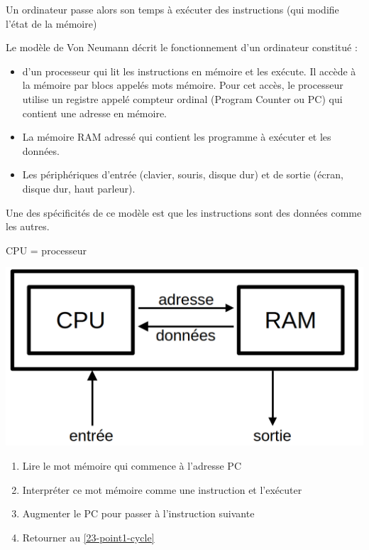 \begin{principe}
	Un ordinateur passe alors son temps à exécuter des instructions (qui modifie l'état de la mémoire)
\end{principe}

\begin{definition}
 	Le modèle de Von Neumann décrit le fonctionnement d'un ordinateur constitué : \begin{itemize}[label=$\bullet$] 
		\item d'un processeur qui lit les instructions en mémoire et les exécute. Il accède à la mémoire par blocs appelés mots mémoire. Pour cet accès, le processeur utilise un registre appelé compteur ordinal (Program Counter ou PC) qui contient une adresse en mémoire.
		\item La mémoire RAM adressé qui contient les programme à exécuter et les données. 
		\item Les périphériques d'entrée (clavier, souris, disque dur) et de sortie (écran, disque dur, haut parleur).
	 \end{itemize}
\end{definition}

\begin{rem}
	Une des spécificités de ce modèle est que les instructions sont des données comme les autres.
\end{rem}

\begin{personalise} CPU = processeur
	\begin{center}
		\includegraphics[width=0.5\linewidth]{lecon/23-archi-assembleur/modele_neumann.png}
	\end{center}
\end{personalise}

\begin{definition}
	\begin{enumerate}
		\item \label{23-point1-cycle} Lire le mot mémoire qui commence à l'adresse PC
		\item Interpréter ce mot mémoire comme une instruction et l'exécuter
		\item Augmenter le PC pour passer à l'instruction suivante
		\item Retourner au \ref*{23-point1-cycle}
	\end{enumerate}
\end{definition}

